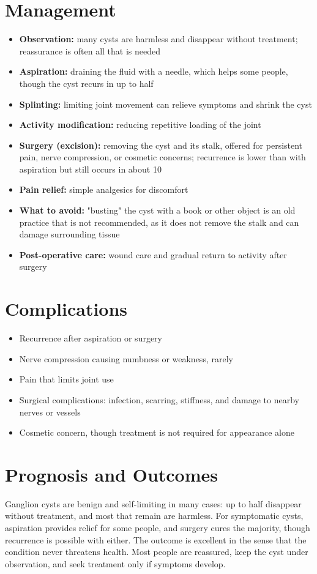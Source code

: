 \section*{Management}
\begin{itemize}
    \item \textbf{Observation:} many cysts are harmless and disappear without treatment; reassurance is often all that is needed
    \item \textbf{Aspiration:} draining the fluid with a needle, which helps some people, though the cyst recurs in up to half
    \item \textbf{Splinting:} limiting joint movement can relieve symptoms and shrink the cyst
    \item \textbf{Activity modification:} reducing repetitive loading of the joint
    \item \textbf{Surgery (excision):} removing the cyst and its stalk, offered for persistent pain, nerve compression, or cosmetic concerns; recurrence is lower than with aspiration but still occurs in about 10%
    \item \textbf{Pain relief:} simple analgesics for discomfort
    \item \textbf{What to avoid:} "busting" the cyst with a book or other object is an old practice that is not recommended, as it does not remove the stalk and can damage surrounding tissue
    \item \textbf{Post-operative care:} wound care and gradual return to activity after surgery
\end{itemize}

\section*{Complications}
\begin{itemize}
    \item Recurrence after aspiration or surgery
    \item Nerve compression causing numbness or weakness, rarely
    \item Pain that limits joint use
    \item Surgical complications: infection, scarring, stiffness, and damage to nearby nerves or vessels
    \item Cosmetic concern, though treatment is not required for appearance alone
\end{itemize}

\section*{Prognosis and Outcomes}
Ganglion cysts are benign and self-limiting in many cases: up to half disappear without treatment, and most that remain are harmless. For symptomatic cysts, aspiration provides relief for some people, and surgery cures the majority, though recurrence is possible with either. The outcome is excellent in the sense that the condition never threatens health. Most people are reassured, keep the cyst under observation, and seek treatment only if symptoms develop.

